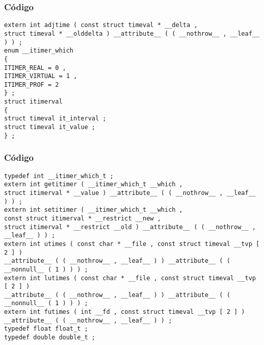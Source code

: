 \documentclass{beamer}
\begin{document}
\begin{frame}[fragile]
\frametitle{C\'odigo}
\begin{verbatim}
extern int adjtime ( const struct timeval * __delta , 
struct timeval * __olddelta ) __attribute__ ( ( __nothrow__ , __leaf__ ) ) ; 
enum __itimer_which 
{ 
ITIMER_REAL = 0 , 
ITIMER_VIRTUAL = 1 , 
ITIMER_PROF = 2 
} ; 
struct itimerval 
{ 
struct timeval it_interval ; 
struct timeval it_value ; 
} ; 
\end{verbatim}
\end{frame}
\begin{frame}[fragile]
\frametitle{C\'odigo}
\begin{verbatim}
typedef int __itimer_which_t ; 
extern int getitimer ( __itimer_which_t __which , 
struct itimerval * __value ) __attribute__ ( ( __nothrow__ , __leaf__ ) ) ; 
extern int setitimer ( __itimer_which_t __which , 
const struct itimerval * __restrict __new , 
struct itimerval * __restrict __old ) __attribute__ ( ( __nothrow__ , __leaf__ ) ) ; 
extern int utimes ( const char * __file , const struct timeval __tvp [ 2 ] ) 
__attribute__ ( ( __nothrow__ , __leaf__ ) ) __attribute__ ( ( __nonnull__ ( 1 ) ) ) ; 
extern int lutimes ( const char * __file , const struct timeval __tvp [ 2 ] ) 
__attribute__ ( ( __nothrow__ , __leaf__ ) ) __attribute__ ( ( __nonnull__ ( 1 ) ) ) ; 
extern int futimes ( int __fd , const struct timeval __tvp [ 2 ] ) __attribute__ ( ( __nothrow__ , __leaf__ ) ) ; 
typedef float float_t ; 
typedef double double_t ; 
\end{verbatim}
\end{frame}
\end{document}
